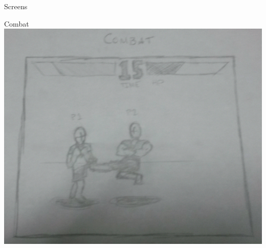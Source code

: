 \documentclass[12pt]{report}
\begin{document}
\begin{section}{Screens}
\begin{subsection}{Combat}
\includegraphics[width=\textwidth]{combat.png}
\end{subsection}

\end{section}
\end{document}
